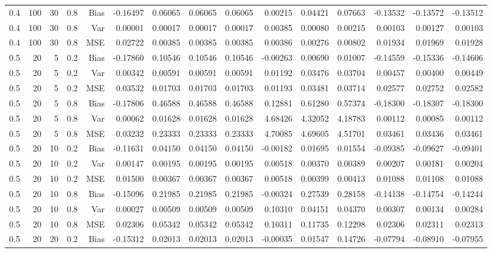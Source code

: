 \begin{table}[!htbp]
\begin{tabular}{lrrrrrrrrrrrrrr}
0.4 & 100 & 30 & 0.8 & Bias & -0.16497 & 0.06065 & 0.06065 & 0.06065 & 0.00215 & 0.04421 & 0.07663 & -0.13532 & -0.13572 & -0.13512 \\
0.4 & 100 & 30 & 0.8 & Var & 0.00001 & 0.00017 & 0.00017 & 0.00017 & 0.00385 & 0.00080 & 0.00215 & 0.00103 & 0.00127 & 0.00103 \\
0.4 & 100 & 30 & 0.8 & MSE & 0.02722 & 0.00385 & 0.00385 & 0.00385 & 0.00386 & 0.00276 & 0.00802 & 0.01934 & 0.01969 & 0.01928 \\
0.5 &  20 &  5 & 0.2 & Bias & -0.17860 & 0.10546 & 0.10546 & 0.10546 & -0.00263 & 0.00690 & 0.01007 & -0.14559 & -0.15336 & -0.14606 \\
0.5 &  20 &  5 & 0.2 & Var & 0.00342 & 0.00591 & 0.00591 & 0.00591 & 0.01192 & 0.03476 & 0.03704 & 0.00457 & 0.00400 & 0.00449 \\
0.5 &  20 &  5 & 0.2 & MSE & 0.03532 & 0.01703 & 0.01703 & 0.01703 & 0.01193 & 0.03481 & 0.03714 & 0.02577 & 0.02752 & 0.02582 \\
0.5 &  20 &  5 & 0.8 & Bias & -0.17806 & 0.46588 & 0.46588 & 0.46588 & 0.12881 & 0.61280 & 0.57374 & -0.18300 & -0.18307 & -0.18300 \\
0.5 &  20 &  5 & 0.8 & Var & 0.00062 & 0.01628 & 0.01628 & 0.01628 & 4.68426 & 4.32052 & 4.18783 & 0.00112 & 0.00085 & 0.00112 \\
0.5 &  20 &  5 & 0.8 & MSE & 0.03232 & 0.23333 & 0.23333 & 0.23333 & 4.70085 & 4.69605 & 4.51701 & 0.03461 & 0.03436 & 0.03461 \\
0.5 &  20 & 10 & 0.2 & Bias & -0.11631 & 0.04150 & 0.04150 & 0.04150 & -0.00182 & 0.01695 & 0.01554 & -0.09385 & -0.09627 & -0.09401 \\
0.5 &  20 & 10 & 0.2 & Var & 0.00147 & 0.00195 & 0.00195 & 0.00195 & 0.00518 & 0.00370 & 0.00389 & 0.00207 & 0.00181 & 0.00204 \\
0.5 &  20 & 10 & 0.2 & MSE & 0.01500 & 0.00367 & 0.00367 & 0.00367 & 0.00518 & 0.00399 & 0.00413 & 0.01088 & 0.01108 & 0.01088 \\
0.5 &  20 & 10 & 0.8 & Bias & -0.15096 & 0.21985 & 0.21985 & 0.21985 & -0.00324 & 0.27539 & 0.28158 & -0.14138 & -0.14754 & -0.14244 \\
0.5 &  20 & 10 & 0.8 & Var & 0.00027 & 0.00509 & 0.00509 & 0.00509 & 0.10310 & 0.04151 & 0.04370 & 0.00307 & 0.00134 & 0.00284 \\
0.5 &  20 & 10 & 0.8 & MSE & 0.02306 & 0.05342 & 0.05342 & 0.05342 & 0.10311 & 0.11735 & 0.12298 & 0.02306 & 0.02311 & 0.02313 \\
0.5 &  20 & 20 & 0.2 & Bias & -0.15312 & 0.02013 & 0.02013 & 0.02013 & -0.00035 & 0.01547 & 0.14726 & -0.07794 & -0.08910 & -0.07955 \\

\end{tabular}
\end{table}
